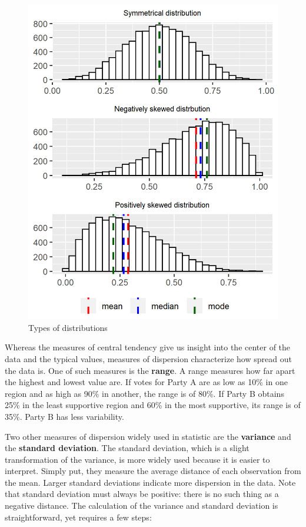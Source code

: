 \documentclass{book}
\begin{document}
\begin{figure}
\hypertarget{fig:plots}{%
\centering
\includegraphics{images/data/plots.png}
\caption{Types of distributions}\label{fig:plots}
}
\end{figure}

Whereas the measures of central tendency give us insight into the center of
the data and the typical values, measures of dispersion characterize how
spread out the data is. One of such measures is the \textbf{range}. A range
measures how far apart the highest and lowest value are. If votes for Party A
are as low as 10\% in one region and as high as 90\% in another, the range is
of 80\%. If Party B obtains 25\% in the least supportive region and 60\% in
the most supportive, its range is of 35\%. Party B has less variability.

Two other measures of dispersion widely used in statistic are the
\textbf{variance} and the \textbf{standard deviation}. The standard deviation,
which is a slight transformation of the variance, is more widely used because
it is easier to interpret. Simply put, they measure the average distance of
each observation from the mean. Larger standard deviations indicate more
dispersion in the data. Note that standard deviation must always be positive:
there is no such thing as a negative distance. The calculation of the variance
and standard deviation is straightforward, yet requires a few steps:
\end{document}
